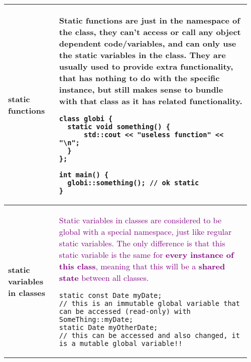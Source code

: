 \documentclass[main.tex,fontsize=8pt,paper=a4,paper=portrait,DIV=calc]{scrartcl}
\begin{document}
\begin{table}[ht!]
\begin{tabular}{|m{0.2\linewidth}|m{0.755\linewidth}|}
\hline
static functions & 
Static functions are just in the namespace of the class, they can't access or call any object dependent code/variables, and can only use the static variables in the class.\newline
They are usually used to provide extra functionality, that has nothing to do with the specific instance, but still makes sense to bundle with that class as it has related functionality.\newline
\begin{lstlisting}
class globi {
  static void something() {
      std::cout << "useless function" << "\n";
  }
};

int main() { 
  globi::something(); // ok static
}
\end{lstlisting}\\
\hline
\textbf{static variables in classes} &
\textcolor{purple}{Static variables in classes are considered to be global with a special namespace, just like regular static variables.\newline
The only difference is that this static variable is the same for \textbf{every instance of this class}, meaning that this will be a \textbf{shared state} between all classes.}
\begin{lstlisting}
static const Date myDate;
// this is an immutable global variable that can be accessed (read-only) with SomeThing::myDate;
static Date myOtherDate;
// this can be accessed and also changed, it is a mutable global variable!!
\end{lstlisting}\\
\hline
\end{tabular}

\end{table}
\end{document}
